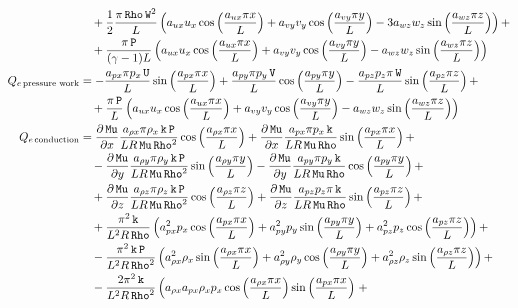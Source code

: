\documentclass[10pt]{article}
\newcommand{\diff}[2] {\dfrac{\partial #1}{\partial #2}}
\newcommand{\Rho}{\,\mathtt{Rho}}
\newcommand{\PP}{\,\mathtt{P}}
\newcommand{\U}{\,\mathtt{U}}
\newcommand{\V}{\,\mathtt{V}}
\newcommand{\W}{\,\mathtt{W}}
\newcommand{\Mu}{\,\mathtt{Mu}}
\newcommand{\DMuDx}{\diff{\Mu}{x}}
\newcommand{\DMuDy}{\diff{\Mu}{y}}
\newcommand{\DMuDz}{\diff{\Mu}{z}}
\newcommand{\kk}{\,\mathtt{k}}
\newcommand{\conduction}{\,\text{conduction}}
\newcommand{\workpressure}{\,\text{pressure work}}
\begin{document}
\begin{equation*}
\begin{split}
&\quad+\dfrac{1}{2} \dfrac{\pi \Rho \W^2}{L}\left(a_{ux} u_x \cos\left(\dfrac{a_{ux} \pi x}{L}\right)+a_{vy} v_y \cos\left(\dfrac{a_{vy} \pi y}{L}\right)-3 a_{wz} w_z \sin\left(\dfrac{a_{wz} \pi z}{L}\right)\right) +\\
&\quad+ \dfrac{\pi \PP}{(\gamma-1) L}\left(a_{ux} u_x \cos\left(\dfrac{a_{ux} \pi x}{L}\right)+a_{vy} v_y \cos\left(\dfrac{a_{vy} \pi y}{L}\right)-a_{wz} w_z \sin\left(\dfrac{a_{wz} \pi z}{L}\right)\right)  \\ \vspace{15pt}
%
Q_{e \workpressure} &= 
-\dfrac{a_{px} \pi p_x \U }{L}\sin\left(\dfrac{a_{px} \pi x}{L}\right) 
+\dfrac{a_{py} \pi p_y \V }{L}\cos\left(\dfrac{a_{py} \pi y}{L}\right)
-\dfrac{a_{pz} p_z \pi \W }{L}\sin\left(\dfrac{a_{pz} \pi z}{L}\right) +\\
&\quad
+ \dfrac{\pi \PP}{L} \left(a_{ux} u_x \cos\left(\dfrac{a_{ux} \pi x}{L}\right)+a_{vy} v_y \cos\left(\dfrac{a_{vy} \pi y}{L}\right)-a_{wz} w_z \sin\left(\dfrac{a_{wz} \pi z}{L}\right)\right) \\ \vspace{15pt}
%
Q_{e \conduction} &= \DMuDx \dfrac{a_{\rho x} \pi \rho_x \kk \PP }{L R \Mu \Rho^2}\cos\left(\dfrac{a_{\rho x} \pi x}{L}\right)  +\DMuDx \dfrac{a_{px} \pi p_x \kk }{L R \Mu \Rho}\sin\left(\dfrac{a_{px} \pi x}{L}\right)+\\
  &\quad-\DMuDy \dfrac{a_{\rho y} \pi \rho_y \kk \PP }{L R \Mu \Rho^2}\sin\left(\dfrac{a_{\rho y} \pi y}{L}\right)  -\DMuDy \dfrac{a_{py} \pi p_y \kk }{L R \Mu \Rho}\cos\left(\dfrac{a_{py} \pi y}{L}\right)+\\
  &\quad+\DMuDz \dfrac{a_{\rho z} \pi \rho_z \kk \PP }{L R \Mu \Rho^2}\cos\left(\dfrac{a_{\rho z} \pi z}{L}\right) +\DMuDz \dfrac{a_{pz}  p_z \pi \kk }{L R \Mu \Rho}\sin\left(\dfrac{a_{pz} \pi z}{L}\right)+\\
  &\quad+ \dfrac{ \pi^2 \kk}{L^2 R \Rho}\left(a_{px}^2 p_x \cos\left(\dfrac{a_{px} \pi x}{L}\right)+a_{py}^2 p_y \sin\left(\dfrac{a_{py} \pi y}{L}\right)+a_{pz}^2 p_z \cos\left(\dfrac{a_{pz} \pi z}{L}\right)\right)+\\
  &\quad- \dfrac{\pi^2 \kk \PP }{L^2 R \Rho^2}\left(a_{\rho x}^2 \rho_x \sin\left(\dfrac{a_{\rho x} \pi x}{L}\right)+a_{\rho y}^2 \rho_y \cos\left(\dfrac{a_{\rho y} \pi y}{L}\right)+a_{\rho z}^2 \rho_z \sin\left(\dfrac{a_{\rho z} \pi z}{L}\right)\right)+\\
  &\quad-\dfrac{2\pi^2 \kk }{L^2 R \Rho^2}  \left(a_{\rho x} a_{px} \rho_x p_x \cos\left(\dfrac{a_{\rho x} \pi x}{L}\right) \sin\left(\dfrac{a_{px} \pi x}{L}\right)\right.+\\

\end{split}
\end{equation*}
\end{document}
